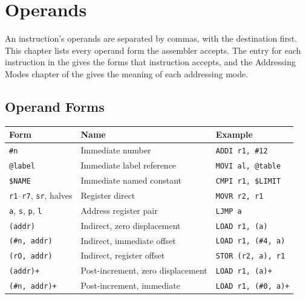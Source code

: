 \chapter{Operands}
\label{ch:operands}

An instruction's operands are separated by commas, with the destination first. This chapter lists every operand form
the assembler accepts. The entry for each instruction in the \archmanual{} gives the forms that instruction accepts,
and the Addressing Modes chapter of the \archmanual{} gives the meaning of each addressing mode.

\section{Operand Forms}

\begin{table}[H]
	\centering
	\begin{tabular}{lll}
		\toprule
		\textbf{Form}                                  & \textbf{Name}                     & \textbf{Example}              \\
		\midrule
		\texttt{\#n}                                   & Immediate number                  & \texttt{ADDI r1, \#12}        \\
		\texttt{@label}                                & Immediate label reference         & \texttt{MOVI al, @table}      \\
		\texttt{\$NAME}                                & Immediate named constant          & \texttt{CMPI r1, \$LIMIT}     \\
		\texttt{r1}--\texttt{r7}, \texttt{sr}, halves  & Register direct                   & \texttt{MOVR r2, r1}          \\
		\texttt{a}, \texttt{s}, \texttt{p}, \texttt{l} & Address register pair             & \texttt{LJMP a}               \\
		\texttt{(addr)}                                & Indirect, zero displacement       & \texttt{LOAD r1, (a)}         \\
		\texttt{(\#n, addr)}                           & Indirect, immediate offset        & \texttt{LOAD r1, (\#4, a)}    \\
		\texttt{(rO, addr)}                            & Indirect, register offset         & \texttt{STOR (r2, a), r1}     \\
		\texttt{(addr)+}                               & Post-increment, zero displacement & \texttt{LOAD r1, (a)+}        \\
		\texttt{(\#n, addr)+}                          & Post-increment, immediate         & \texttt{LOAD r1, (\#0, a)+}   \\

\end{tabular}
\end{table}
